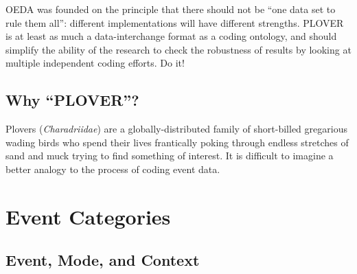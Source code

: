 \documentclass[11pt]{report}
\begin{document}
OEDA was founded on the principle that there should not be ``one data set to rule them all'': different implementations will have different strengths. PLOVER is at least as much a data-interchange format as a coding ontology, and should simplify the ability of the research to check the robustness of results by looking at multiple independent coding efforts. Do it!



\section{Why ``PLOVER''?}

Plovers (\textit{Charadriidae}) are a globally-distributed family of short-billed gregarious wading birds who spend their lives frantically poking through endless stretches of sand and muck trying to find something of interest. It is difficult to imagine a better analogy to the process of coding event data.


\chapter{Event Categories}



\section{Event, Mode, and Context}\label{ssec:ecm}
\end{document}
